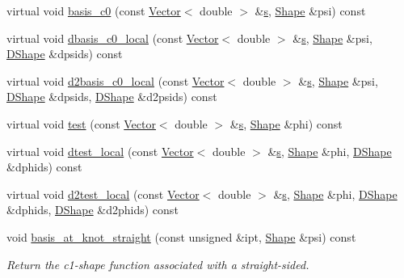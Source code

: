 \begin{DoxyCompactItemize}
\item 
virtual void \hyperlink{classoomph_1_1C1CurvedElementBase_af8dc76a0a5b61c9995e172007b96a3bd}{basis\+\_\+c0} (const \hyperlink{classoomph_1_1Vector}{Vector}$<$ double $>$ \&\hyperlink{cfortran_8h_ab7123126e4885ef647dd9c6e3807a21c}{s}, \hyperlink{classoomph_1_1Shape}{Shape} \&psi) const
\item 
virtual void \hyperlink{classoomph_1_1C1CurvedElementBase_aea6eaf2184fb2ebe373b10e0e700caf3}{dbasis\+\_\+c0\+\_\+local} (const \hyperlink{classoomph_1_1Vector}{Vector}$<$ double $>$ \&\hyperlink{cfortran_8h_ab7123126e4885ef647dd9c6e3807a21c}{s}, \hyperlink{classoomph_1_1Shape}{Shape} \&psi, \hyperlink{classoomph_1_1DShape}{D\+Shape} \&dpsids) const
\item 
virtual void \hyperlink{classoomph_1_1C1CurvedElementBase_a72e258f980ba1f790e1ba0bc4ec6ef0a}{d2basis\+\_\+c0\+\_\+local} (const \hyperlink{classoomph_1_1Vector}{Vector}$<$ double $>$ \&\hyperlink{cfortran_8h_ab7123126e4885ef647dd9c6e3807a21c}{s}, \hyperlink{classoomph_1_1Shape}{Shape} \&psi, \hyperlink{classoomph_1_1DShape}{D\+Shape} \&dpsids, \hyperlink{classoomph_1_1DShape}{D\+Shape} \&d2psids) const
\item 
virtual void \hyperlink{classoomph_1_1C1CurvedElementBase_aa953e1d89a6c059ac89c972feb0aea74}{test} (const \hyperlink{classoomph_1_1Vector}{Vector}$<$ double $>$ \&\hyperlink{cfortran_8h_ab7123126e4885ef647dd9c6e3807a21c}{s}, \hyperlink{classoomph_1_1Shape}{Shape} \&phi) const
\item 
virtual void \hyperlink{classoomph_1_1C1CurvedElementBase_a49a851713b2d274f14602f05733470fa}{dtest\+\_\+local} (const \hyperlink{classoomph_1_1Vector}{Vector}$<$ double $>$ \&\hyperlink{cfortran_8h_ab7123126e4885ef647dd9c6e3807a21c}{s}, \hyperlink{classoomph_1_1Shape}{Shape} \&phi, \hyperlink{classoomph_1_1DShape}{D\+Shape} \&dphids) const
\item 
virtual void \hyperlink{classoomph_1_1C1CurvedElementBase_aedb2b90914f244cd86b2565a658cb9eb}{d2test\+\_\+local} (const \hyperlink{classoomph_1_1Vector}{Vector}$<$ double $>$ \&\hyperlink{cfortran_8h_ab7123126e4885ef647dd9c6e3807a21c}{s}, \hyperlink{classoomph_1_1Shape}{Shape} \&phi, \hyperlink{classoomph_1_1DShape}{D\+Shape} \&dphids, \hyperlink{classoomph_1_1DShape}{D\+Shape} \&d2phids) const
\item 
void \hyperlink{classoomph_1_1C1CurvedElementBase_a5b3e87cecd6887bfc7bcae8f52ebe9e4}{basis\+\_\+at\+\_\+knot\+\_\+straight} (const unsigned \&ipt, \hyperlink{classoomph_1_1Shape}{Shape} \&psi) const
\begin{DoxyCompactList}\small\item\em Return the c1-\/shape function associated with a straight-\/sided. \end{DoxyCompactList}\item 

\end{DoxyCompactItemize}

